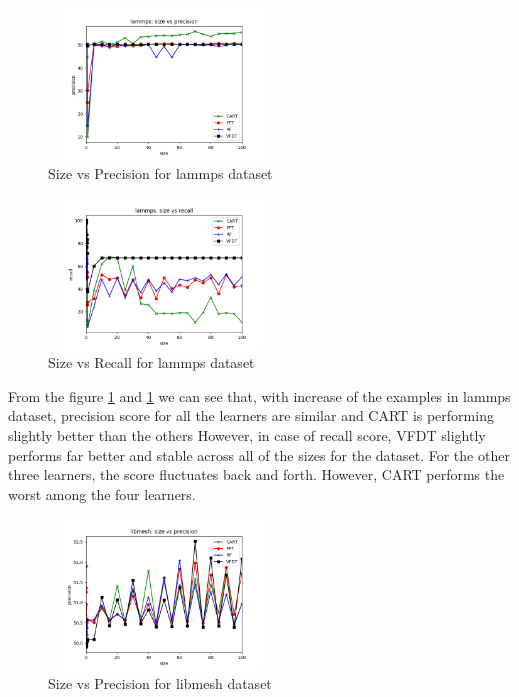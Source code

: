 \documentclass[sigplan]{acmart}\settopmatter{printfolios=true,printccs=false,printacmref=false}
\begin{document}
\begin{figure}[h]
	\includegraphics[width=6cm,height=4cm,keepaspectratio]{fig/lammps-size-precision.png}
	\caption{Size vs Precision for lammps dataset}
	\label{fig:lm-size-prec}
\end{figure}

\begin{figure}[h]
	\includegraphics[width=6cm,height=4cm,keepaspectratio]{fig/lammps-size-recall.png}
	\caption{Size vs Recall for lammps dataset}
	\label{fig:lm-size-rec}
\end{figure}

From the figure \ref{fig:lm-size-prec} and \ref{fig:lm-size-prec} we can see that, with increase of the examples in lammps dataset, precision score for all the learners are similar and CART is performing slightly better than the others However, in case of recall score, VFDT slightly performs far better and stable across all of the sizes for the dataset. For the other three learners, the score fluctuates back and forth. However, CART performs the worst among the four learners. 

\begin{figure}[h]
	\includegraphics[width=6cm,height=4cm,keepaspectratio]{fig/libmesh-size-precision.png}
	\caption{Size vs Precision for libmesh dataset}
	\label{fig:lb-size-prec}
\end{figure}
\end{document}
